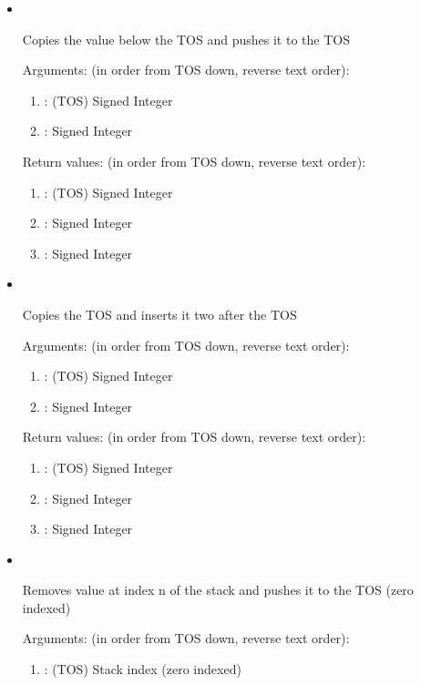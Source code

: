 \begin{itemize}
\item {}\ 

\noindent Copies the value below the TOS and pushes it to the TOS

\noindent Arguments: (in order from TOS down, reverse text order):
\begin{enumerate}
\item {}: (TOS) Signed Integer
\item {}: Signed Integer
\end{enumerate}

\noindent Return values: (in order from TOS down, reverse text order):
\begin{enumerate}
\item {}: (TOS) Signed Integer
\item {}: Signed Integer
\item {}: Signed Integer
\end{enumerate}

\item {}\ 

\noindent Copies the TOS and inserts it two after the TOS

\noindent Arguments: (in order from TOS down, reverse text order):
\begin{enumerate}
\item {}: (TOS) Signed Integer
\item {}: Signed Integer
\end{enumerate}

\noindent Return values: (in order from TOS down, reverse text order):
\begin{enumerate}
\item {}: (TOS) Signed Integer
\item {}: Signed Integer
\item {}: Signed Integer
\end{enumerate}

\item {}\ 

\noindent Removes value at index n of the stack and pushes it to the TOS (zero indexed)

\noindent Arguments: (in order from TOS down, reverse text order):
\begin{enumerate}
\item {}: (TOS) Stack index (zero indexed)
\end{enumerate}


\end{itemize}
